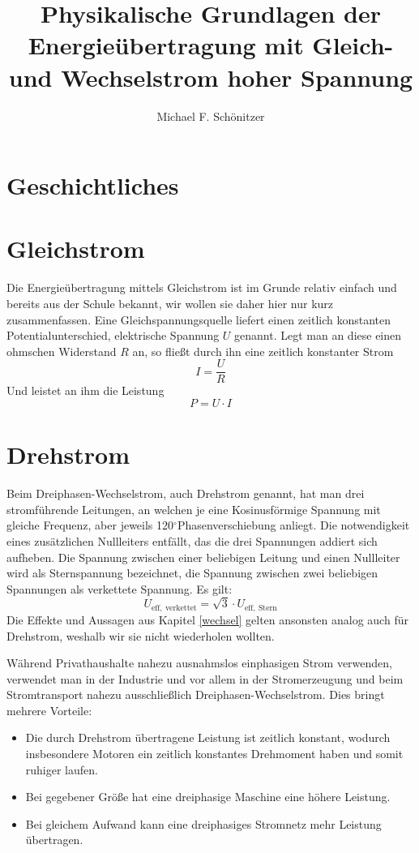\documentclass[10pt,a4paper]{article}
\author{Michael F. Schönitzer}
\title{Physikalische Grundlagen der Energieübertragung mit Gleich- und Wechselstrom hoher Spannung }
\newcommand{\degree}{$^\circ$}
\begin{document}
\maketitle

\section{Geschichtliches}

\section{Gleichstrom}
Die Energieübertragung mittels Gleichstrom ist im Grunde relativ einfach und bereits aus der Schule bekannt, wir wollen sie daher hier nur kurz zusammenfassen.
Eine Gleichspannungsquelle liefert einen zeitlich konstanten Potentialunterschied, elektrische Spannung $U$ genannt. Legt man an diese einen ohmschen Widerstand $R$ an, so fließt durch ihn eine zeitlich konstanter Strom
\begin{equation}
I = \frac{U}{R}
\end{equation}
Und leistet an ihm die Leistung
\begin{equation}
P = U \cdot I
\end{equation}




\section{Drehstrom}
Beim Dreiphasen-Wechselstrom, auch Drehstrom genannt, hat man drei stromführende Leitungen, an welchen je eine Kosinusförmige Spannung mit gleiche Frequenz, aber jeweils 120\degree Phasenverschiebung anliegt.
Die notwendigkeit eines zusätzlichen Nullleiters entfällt, das die drei Spannungen addiert sich aufheben.
Die Spannung zwischen einer beliebigen Leitung und einen Nullleiter wird als Sternspannung bezeichnet,
die Spannung zwischen zwei beliebigen Spannungen als verkettete Spannung. Es gilt:
\begin{equation}
U_{\mathrm{eff},\:\mathrm{verkettet}} = \sqrt{3} \cdot U_{\mathrm{eff},\:\mathrm{Stern}}
\end{equation}
Die Effekte und Aussagen aus Kapitel \ref{wechsel} gelten ansonsten analog auch für Drehstrom, weshalb wir sie nicht wiederholen wollten.

Während Privathaushalte nahezu ausnahmslos einphasigen Strom verwenden, verwendet man in der Industrie und vor allem in der Stromerzeugung und beim Stromtransport nahezu ausschließlich Dreiphasen-Wechselstrom. Dies bringt mehrere Vorteile\cite{Harrison}:
\begin{itemize}
\item Die durch Drehstrom übertragene Leistung ist zeitlich konstant, wodurch insbesondere Motoren ein zeitlich konstantes Drehmoment haben und somit ruhiger laufen.
\item Bei gegebener Größe hat eine dreiphasige Maschine eine höhere Leistung.
\item Bei gleichem Aufwand kann eine dreiphasiges Stromnetz mehr Leistung übertragen.
\end{itemize}
\end{document}
